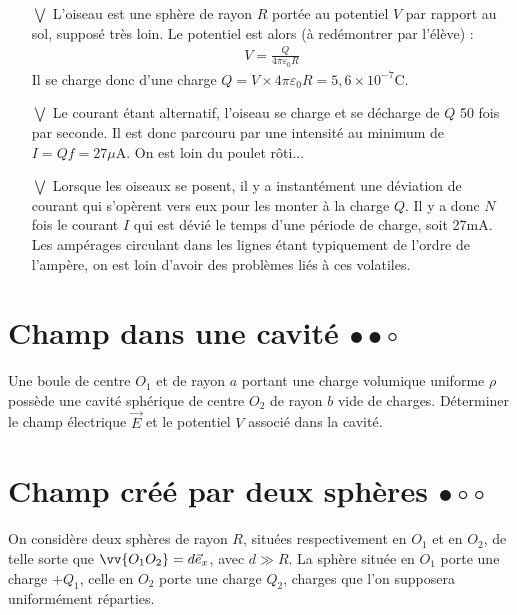 \documentclass{report}
\begin{document}
\begin{itemize}

	\item[$\bigvee$] L'oiseau est une sphère de rayon $R$ portée au potentiel $V$ par rapport au sol, supposé très loin. Le potentiel est alors (à redémontrer par l'élève) :
	\begin{align*}
		V=\frac{Q}{4\pi\varepsilon_0 R}
	\end{align*}
	Il se charge donc d'une charge $Q=V\times 4\pi\varepsilon_0R=5,6\times10^{-7}$C.
	
	\item[$\bigvee$] Le courant étant alternatif, l'oiseau se charge et se décharge de $Q$ 50 fois par seconde. Il est donc parcouru par une intensité au minimum de $I=Qf=27\mu$A. On est loin du poulet rôti...
	
	\item[$\bigvee$] Lorsque les oiseaux se posent, il y a instantément une déviation de courant qui s'opèrent vers eux pour les monter à la charge $Q$. Il y a donc $N$ fois le courant $I$ qui est dévié le temps d'une période de charge, soit 27mA. Les ampérages circulant dans les lignes étant typiquement de l'ordre de l'ampère, on est loin d'avoir des problèmes liés à ces volatiles.

\end{itemize} 

\newpage		

\section*{Champ dans une cavité $\bullet\bullet\circ$}

Une boule de centre $O_1$ et de rayon $a$ portant une charge volumique uniforme $\rho$ possède une cavité sphérique de centre $O_2$ de rayon $b$ vide de charges. Déterminer le champ électrique $\vec{E}$ et le potentiel $V$ associé dans la cavité.

\newpage

\section*{Champ créé par deux sphères $\bullet\circ\circ$}

On considère deux sphères de rayon $R$, situées respectivement en $O_1$ et en $O_2$, de telle sorte que $\vv{O_1O_2}=d\vec{e}_x$, avec $d\gg R$. La sphère située en $O_1$ porte une charge $+Q_1$, celle en $O_2$ porte une charge $Q_2$, charges que l'on supposera uniformément réparties. 
\end{document}
